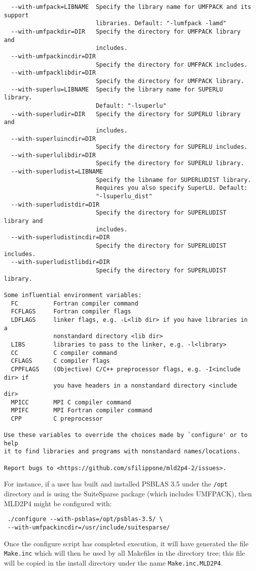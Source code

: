 \begin{verbatim}
  --with-umfpack=LIBNAME  Specify the library name for UMFPACK and its support
                          libraries. Default: "-lumfpack -lamd"
  --with-umfpackdir=DIR   Specify the directory for UMFPACK library and
                          includes.
  --with-umfpackincdir=DIR
                          Specify the directory for UMFPACK includes.
  --with-umfpacklibdir=DIR
                          Specify the directory for UMFPACK library.
  --with-superlu=LIBNAME  Specify the library name for SUPERLU library.
                          Default: "-lsuperlu"
  --with-superludir=DIR   Specify the directory for SUPERLU library and
                          includes.
  --with-superluincdir=DIR
                          Specify the directory for SUPERLU includes.
  --with-superlulibdir=DIR
                          Specify the directory for SUPERLU library.
  --with-superludist=LIBNAME
                          Specify the libname for SUPERLUDIST library.
                          Requires you also specify SuperLU. Default:
                          "-lsuperlu_dist"
  --with-superludistdir=DIR
                          Specify the directory for SUPERLUDIST library and
                          includes.
  --with-superludistincdir=DIR
                          Specify the directory for SUPERLUDIST includes.
  --with-superludistlibdir=DIR
                          Specify the directory for SUPERLUDIST library.

Some influential environment variables:
  FC          Fortran compiler command
  FCFLAGS     Fortran compiler flags
  LDFLAGS     linker flags, e.g. -L<lib dir> if you have libraries in a
              nonstandard directory <lib dir>
  LIBS        libraries to pass to the linker, e.g. -l<library>
  CC          C compiler command
  CFLAGS      C compiler flags
  CPPFLAGS    (Objective) C/C++ preprocessor flags, e.g. -I<include dir> if
              you have headers in a nonstandard directory <include dir>
  MPICC       MPI C compiler command
  MPIFC       MPI Fortran compiler command
  CPP         C preprocessor

Use these variables to override the choices made by `configure' or to help
it to find libraries and programs with nonstandard names/locations.

Report bugs to <https://github.com/sfilippone/mld2p4-2/issues>.
\end{verbatim}

For instance, if a user has built and installed PSBLAS 3.5 under the
\verb|/opt| directory and is
using the SuiteSparse package (which includes UMFPACK), then MLD2P4
might be configured with:
\begin{verbatim}
 ./configure --with-psblas=/opt/psblas-3.5/ \
 --with-umfpackincdir=/usr/include/suitesparse/
\end{verbatim}
Once the configure script has completed execution, it will have
generated the file \verb|Make.inc| which will then be used by all
Makefiles in the directory tree; this file will be copied in the
install directory under the name \verb|Make.inc.MLD2P4|.

